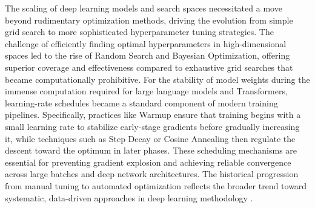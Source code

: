 The scaling of deep learning models and search spaces necessitated a move beyond rudimentary optimization methods, driving the evolution from simple grid search to more sophisticated hyperparameter tuning strategies. The challenge of efficiently finding optimal hyperparameters in high-dimensional spaces led to the rise of Random Search and Bayesian Optimization, offering superior coverage and effectiveness compared to exhaustive grid searches that became computationally prohibitive. For the stability of model weights during the immense computation required for large language models and Transformers, learning-rate schedules became a standard component of modern training pipelines. Specifically, practices like Warmup ensure that training begins with a small learning rate to stabilize early-stage gradients before gradually increasing it, while techniques such as Step Decay or Cosine Annealing then regulate the descent toward the optimum in later phases. These scheduling mechanisms are essential for preventing gradient explosion and achieving reliable convergence across large batches and deep network architectures. The historical progression from manual tuning to automated optimization reflects the broader trend toward systematic, data-driven approaches in deep learning methodology \textcite{GoodfellowEtAl2016,Prince2023,D2LChapterOptimization}.


